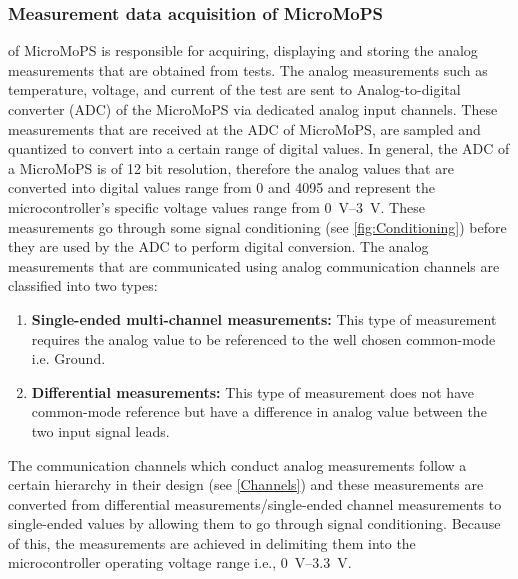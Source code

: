 \subsubsection{Measurement data acquisition of MicroMoPS}\label{sec:DAQ} 
 of MicroMoPS is responsible for acquiring, displaying and storing the analog measurements that are obtained from tests. 
The analog measurements such as temperature, voltage, and current of the test are sent to Analog-to-digital converter (ADC) of the MicroMoPS via dedicated analog input channels. 
These measurements that are received at the ADC of MicroMoPS, are sampled and quantized to convert into a certain range of digital values. 
In general, the ADC of a MicroMoPS is of 12 bit resolution, therefore the analog values that are converted into digital values range from 0 and 4095 and represent the microcontroller's specific voltage values range from \SIrange{0}{3}{\volt}. 
These measurements go through some signal conditioning (see \cref{fig:Conditioning}) before they are used by the ADC to perform digital conversion.
The analog measurements that are communicated using analog communication channels are classified into two types: 
\begin{enumerate}
\item \textbf{Single-ended multi-channel measurements:} This type of measurement requires the analog value to be referenced to the well chosen common-mode i.e. Ground.
\item \textbf{Differential measurements:} This type of measurement does not have common-mode reference but have a difference in analog value between the two input signal leads.
\end{enumerate}

The communication channels which conduct analog measurements follow a certain hierarchy in their design (see \cref{Channels}) and these measurements are converted from differential measurements/single-ended channel measurements to single-ended values by allowing them to go through signal conditioning. 
Because of this, the measurements are achieved in delimiting them into the microcontroller operating voltage range i.e., \SIrange{0}{3.3}{\volt}.

